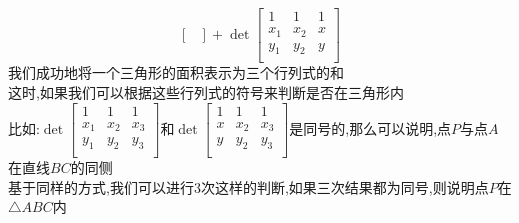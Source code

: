 \documentclass{article}
\begin{document}
\begin{CJK}{UTF8}{gkai}
\[\begin{bmatrix}
\end{bmatrix}
+\det
\begin{bmatrix}
    1&1&1\\
    x_1&x_2&x\\
    y_1&y_2&y\\
\end{bmatrix}    
\]
我们成功地将一个三角形的面积表示为三个行列式的和\\
这时,如果我们可以根据这些行列式的符号来判断是否在三角形内\\
比如:$\det\begin{bmatrix}
    1&1&1\\
    x_1&x_2&x_3\\
    y_1&y_2&y_3\\
\end{bmatrix}$和$\det
\begin{bmatrix}
    1&1&1\\
    x&x_2&x_3\\
    y&y_2&y_3\\
\end{bmatrix}$是同号的,那么可以说明,点$P$与点$A$在直线$BC$的同侧\\
基于同样的方式,我们可以进行3次这样的判断,如果三次结果都为同号,则说明点$P$在$\triangle ABC$内\\


\end{CJK}
\end{document}
